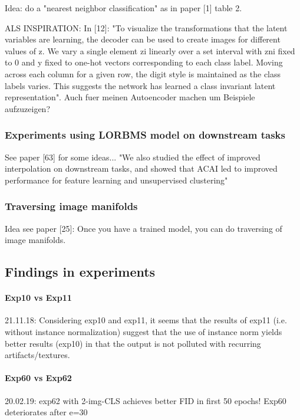 \documentclass[12pt,a4paper]{article}
\begin{document}
Idea: do a "nearest neighbor classification" as in paper [1] table 2.

\par\cite{DiscHiddenFoViDN} ALS INSPIRATION: In [12]: "To visualize the transformations that the latent variables are learning, the decoder can be used to create images for different values of z. We vary a single element zi linearly over a set interval with zni fixed to 0 and y fixed to one-hot vectors corresponding to each class label. Moving across each column for a given row, the digit style is maintained as the class labels varies. This suggests the network has learned a class invariant latent representation". Auch fuer meinen Autoencoder machen um Beispiele aufzuzeigen?

\subsubsection{Experiments using LORBMS model on downstream tasks}
See paper [63] for some ideas... "We also studied the effect of improved interpolation on downstream tasks, and showed that ACAI led to improved performance for feature learning and unsupervised clustering"

\subsubsection{Traversing image manifolds}
Idea see paper [25]: Once you have a trained model, you can do traversing of image manifolds.

\subsection{Findings in experiments}
\paragraph{Exp10 vs Exp11} 21.11.18: Considering exp10 and exp11, it seems that the results of exp11 (i.e. without instance normalization) suggest that the use of instance norm yields better results (exp10) in that the output is not polluted with recurring artifacts/textures.

\paragraph{Exp60 vs Exp62} 20.02.19: exp62 with 2-img-CLS achieves better FID in first 50 epochs! Exp60 deteriorates after e=30
\end{document}
